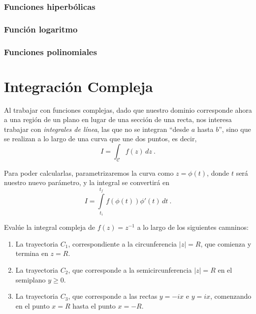 \subsubsection{Funciones hiperbólicas}

\subsubsection{Función logaritmo}

\subsubsection{Funciones polinomiales}


\section{Integración Compleja}

Al trabajar con funciones complejas, dado que nuestro dominio corresponde ahora a una región de un plano en lugar de una sección de una recta, nos interesa trabajar con \emph{integrales de línea}, las que no se integran ``desde $a$ hasta $b$'', sino que se realizan a lo largo de una curva que une dos puntos, es decir,
\begin{equation*}
    I = \int_\mathcal{C} f(z) \, dz \ .
\end{equation*}

Para poder calcularlas, parametrizaremos la curva como $z = \phi(t)$, donde $t$ será nuestro nuevo parámetro, y la integral se convertirá en 
\begin{equation*}
    I = \int\limits^{t_f}_{t_i} f(\phi(t)) \phi'(t) \, dt \ .
\end{equation*}

\begin{ejemplo}
    Evalúe la integral compleja de $f(z) = z^{-1}$ a lo largo de los siguientes camninos:
    \begin{enumerate}[label=\alph*)]
        \item La trayectoria $C_1$, correspondiente a la circunferencia $|z| = R$, que comienza y termina en $z = R$.
        \item La trayectoria $C_2$, que corresponde a la semicircunferencia $|z| = R$ en el semiplano $y \geq 0$.
        \item La trayectoria $C_3$, que corresponde a las rectas $y = -ix$ e $y = ix$, comenzando en el punto $x = R$ hasta el punto $x = -R$.
    \end{enumerate}
    
\end{ejemplo}

